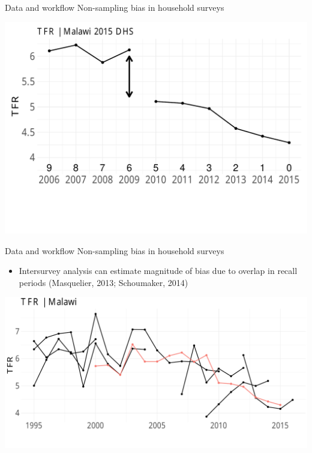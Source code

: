 \documentclass[ignorenonframetext,]{beamer}
\providecommand{\tightlist}{%
  \setlength{\itemsep}{0pt}\setlength{\parskip}{0pt}}
\begin{document}
\begin{frame}[t]{Data and workflow \textbar{} Non-sampling bias in
household surveys}
\protect\hypertarget{data-and-workflow-non-sampling-bias-in-household-surveys-1}{}

\begin{center}\includegraphics[height=0.8\textheight]{2020_04_UNPD_files/figure-beamer/unnamed-chunk-2-1} \end{center}

\end{frame}

\begin{frame}[t]{Data and workflow \textbar{} Non-sampling bias in
household surveys}
\protect\hypertarget{data-and-workflow-non-sampling-bias-in-household-surveys-2}{}

\begin{itemize}
\tightlist
\item
  Intersurvey analysis can estimate magnitude of bias due to overlap in
  recall periods (Masquelier, 2013; Schoumaker, 2014)
\end{itemize}

\begin{center}\includegraphics[height=0.65\textheight]{2020_04_UNPD_files/figure-beamer/unnamed-chunk-3-1} \end{center}

\end{frame}
\end{document}
